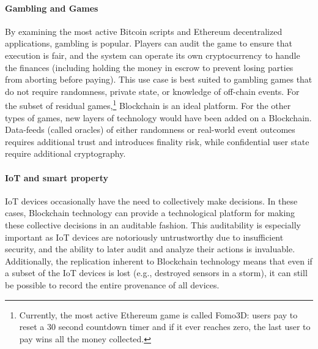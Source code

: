 \paragraph{Gambling and Games}
By examining the most active Bitcoin scripts and Ethereum decentralized applications, gambling is popular. Players can audit the game to ensure that execution is fair, and the system can operate its own cryptocurrency to handle the finances (including holding the money in escrow to prevent losing parties from aborting before paying). This use case is best suited to gambling games that do not require randomness, private state, or knowledge of off-chain events. For the subset of residual games,\footnote{Currently, the most active Ethereum game is called Fomo3D: users pay to reset a 30 second countdown timer and if it ever reaches zero, the last user to pay wins all the money collected.} Blockchain is an ideal platform. For the other types of games, new layers of technology would have been added on a Blockchain. Data-feeds (called oracles) of either randomness or real-world event outcomes requires additional trust and introduces finality risk, while confidential user state require additional cryptography.  

\paragraph{IoT and smart property}
IoT devices occasionally have the need to collectively make decisions.
In these cases, Blockchain technology can provide a technological platform for making these collective decisions in an auditable fashion.
This auditability is especially important as IoT devices are notoriously untrustworthy due to insufficient security, and the ability to later audit and analyze their actions is invaluable.
Additionally, the replication inherent to Blockchain technology means that even if a subset of the IoT devices is lost (e.g., destroyed sensors in a storm), it can still be possible to record the entire provenance of all devices.




